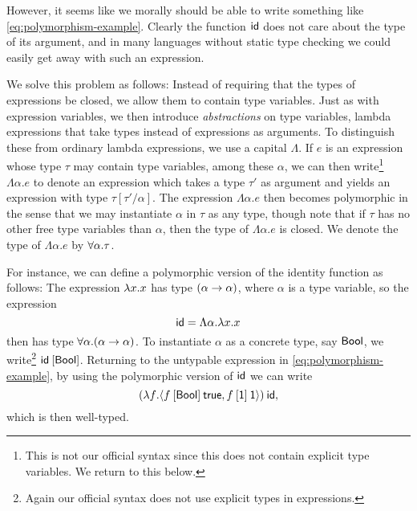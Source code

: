 However, it seems like we morally should be able to write something like \cref{eq:polymorphism-example}. Clearly the function $\mathsf{id}$ does not care about the type of its argument, and in many languages without static type checking we could easily get away with such an expression.

We solve this problem as follows: Instead of requiring that the types of expressions be closed, we allow them to contain type variables. Just as with expression variables, we then introduce \emph{abstractions} on type variables, lambda expressions that take types instead of expressions as arguments. To distinguish these from ordinary lambda expressions, we use a capital $\Lambda$. If $e$ is an expression whose type $\tau$ may contain type variables, among these $\alpha$, we can then write\footnote{This is not our official syntax since this does not contain explicit type variables. We return to this below.} $\Lambda \alpha . e$ to denote an expression which takes a type $\tau'$ as argument and yields an expression with type $\tau[\tau'/\alpha]$. The expression $\Lambda \alpha . e$ then becomes polymorphic in the sense that we may instantiate $\alpha$ in $\tau$ as any type, though note that if $\tau$ has no other free type variables than $\alpha$, then the type of $\Lambda \alpha . e$ is closed. We denote the type of $\Lambda \alpha . e$ by $\typeForall{\alpha}{\tau}$.

For instance, we can define a polymorphic version of the identity function as follows: The expression $\expLam{x}{x}$ has type $\typeFunc*{\alpha}{\alpha}$, where $\alpha$ is a type variable, so the expression
%
\begin{equation*}
    \expId
        = \Lambda \alpha . \expLam{x}{x}
\end{equation*}
%
then has type $\typeForall{\alpha}{\typeFunc*{\alpha}{\alpha}}$. To instantiate $\alpha$ as a concrete type, say $\mathsf{Bool}$, we write\footnote{Again our official syntax does not use explicit types in expressions.} $\expApp{\expId}{[\typeBool]}$. Returning to the untypable expression in \cref{eq:polymorphism-example}, by using the polymorphic version of $\mathsf{id}$ we can write
%
\begin{equation*}
    \expApp{
        \expLam*{f}{
            \expPair{
                \expApp{
                    \expApp{f}{[\typeBool]}
                }{
                    \expTrue
                }
            }{
                \expApp{
                    \expApp{f}{[\typeUnit]}
                }{
                    \expUnit
                }
            }
        }
    }{
        \expId
    },
\end{equation*}
%
which is then well-typed.

